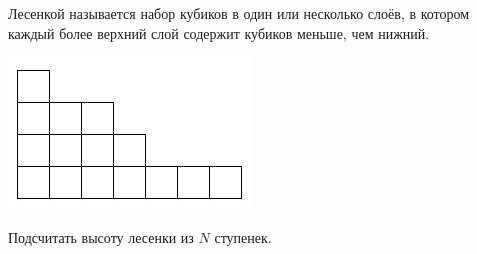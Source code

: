 Лесенкой называется набор кубиков в один или несколько слоёв, в котором
каждый более верхний слой содержит кубиков меньше, чем нижний.

\includegraphics[scale=1,natwidth=243,natheight=152]{pic.jpg}

Подсчитать высоту лесенки из $N$ ступенек.